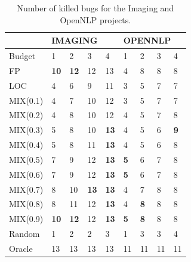 \begin{}
\begin{table}[]
\begin{tabular}{l|llll|llll|}
         & \multicolumn{4}{l}{IMAGING} & \multicolumn{4}{l|}{OPENNLP} \\\hline
Budget   & 1        & 2       & 3       & 4             & 1       & 2       & 3   & 4  \\ \hline
FP       & \textbf{10}&\textbf{12}& 12         & 13             & 4         & 8         & 8     & 8    \\
LOC      & 4          & 6         & 9          & 11             & 3         & 5         & 7     & 7    \\
MIX(0.1) & 4          & 7         & 10         & 12             & 3         & 5         & 7     & 7    \\
MIX(0.2) & 4          & 8         & 10         & 12             & 4         & 5         & 7     & 8    \\
MIX(0.3) & 5          & 8         & 10         & \textbf{13}    & 4         & 5         & 6     &\textbf{9}    \\
MIX(0.4) & 5          & 8         & 11         & \textbf{13}    & 4         & 5         & 6     & 8    \\
MIX(0.5) & 7          & 9         & 12         & \textbf{13}    &\textbf{5} & 6         & 7     & 8    \\
MIX(0.6) & 7          & 9         & 12         & \textbf{13}    &\textbf{5} & 6         & 7     & 8    \\
MIX(0.7) & 8          & 10        & \textbf{13}& \textbf{13}    & 4         & 7         & 8     & 8    \\
MIX(0.8) & 8          & 11        & 12         & \textbf{13}    & 4         &\textbf{8} & 8     & 8    \\
MIX(0.9) & \textbf{10}&\textbf{12}& 12         & \textbf{13}    &\textbf{5} &\textbf{8} & 8     & 8    \\
Random   & 1          & 2         & 2          & 3              & 1         & 3         & 3     & 4    \\  \midrule
Oracle   & 13         & 13        & 13         & 13             & 11        & 11        & 11    & 11   \\ \bottomrule
\end{tabular}
\caption{Number of killed bugs for the Imaging and OpenNLP projects.}
\label{tab:imaging_opennlp}
\end{table}


\end{}
